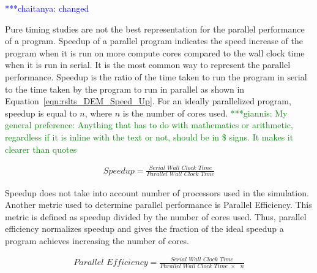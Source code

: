 \documentclass[preprint,11pt,authoryear]{elsarticle}
\newcommand{\csnote}[1]{ {\textcolor{blue} { ***chaitanya: #1 }}}
\newcommand{\gpnote}[1]{{\textcolor{green} {***giannis: #1}}}
\newcommand{\csnote}[1]{}
\newcommand{\gpnote}[1]{}
\begin{document}
\csnote{changed}

Pure timing studies are not the best representation for the parallel performance of a program. 
Speedup of a parallel program indicates the speed increase of the program when it is run on more 
compute cores compared to the wall clock time when it is run in serial. It is the most common way to 
represent the parallel performance. Speedup is the ratio of the time taken to run the program in serial 
to the time taken by the program to run in parallel as shown in Equation~\ref{eqn:rslts_DEM_Speed_Up}. 
For an ideally parallelized program, speedup is equal to $n$, where $n$ is the number of cores used.
\gpnote{My general preference: Anything that has to do with mathematics or arithmetic, regardless if it
    is inline with the text or not, should be in \$ signs. It makes it clearer than quotes}

\begin{align}
\textit{Speedup} = \frac{\textit{Serial Wall Clock Time}}{\textit{Parallel Wall Clock Time}}\label{eqn:rslts_DEM_Speed_Up}
\end{align}

Speedup does not take into account number of processors used in the simulation. Another metric 
used to determine parallel performance is Parallel Efficiency. This metric is defined as 
speedup divided by the number of cores used. Thus, parallel efficiency normalizes speedup and gives 
the fraction of the ideal speedup a program achieves increasing the number of cores.

\begin{align}
\textit{Parallel Efficiency} = \frac{\textit{Serial Wall Clock Time}}{\textit{Parallel Wall Clock Time $\times$ $n$}}
\label{eqn:rslts_DEM_parallel_efficiency}
\end{align}
\end{document}
